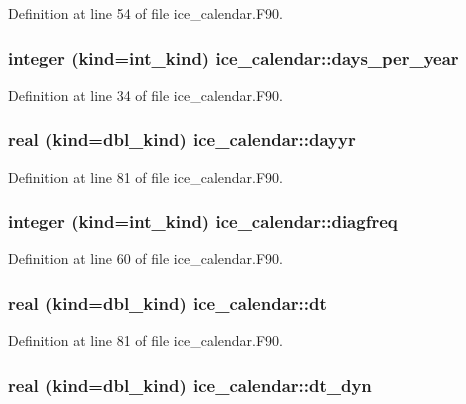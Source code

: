 Definition at line 54 of file ice\_\-calendar.F90.\hypertarget{namespaceice__calendar_a1fa9382761e78de77e0109c55630554b}{
\subsubsection[{days\_\-per\_\-year}]{\setlength{\rightskip}{0pt plus 5cm}integer (kind=int\_\-kind) {\bf ice\_\-calendar::days\_\-per\_\-year}}}
\label{namespaceice__calendar_a1fa9382761e78de77e0109c55630554b}


Definition at line 34 of file ice\_\-calendar.F90.\hypertarget{namespaceice__calendar_a729d7e640fbfecac3733865efcfcb042}{
\subsubsection[{dayyr}]{\setlength{\rightskip}{0pt plus 5cm}real (kind=dbl\_\-kind) {\bf ice\_\-calendar::dayyr}}}
\label{namespaceice__calendar_a729d7e640fbfecac3733865efcfcb042}


Definition at line 81 of file ice\_\-calendar.F90.\hypertarget{namespaceice__calendar_aec83d850502df509fde73dbd084c2dc5}{
\subsubsection[{diagfreq}]{\setlength{\rightskip}{0pt plus 5cm}integer (kind=int\_\-kind) {\bf ice\_\-calendar::diagfreq}}}
\label{namespaceice__calendar_aec83d850502df509fde73dbd084c2dc5}


Definition at line 60 of file ice\_\-calendar.F90.\hypertarget{namespaceice__calendar_a8b89d489532c51cefe59876296c1f568}{
\subsubsection[{dt}]{\setlength{\rightskip}{0pt plus 5cm}real (kind=dbl\_\-kind) {\bf ice\_\-calendar::dt}}}
\label{namespaceice__calendar_a8b89d489532c51cefe59876296c1f568}


Definition at line 81 of file ice\_\-calendar.F90.\hypertarget{namespaceice__calendar_a3bb2bcfc8ce6074351961d80011c706a}{
\subsubsection[{dt\_\-dyn}]{\setlength{\rightskip}{0pt plus 5cm}real (kind=dbl\_\-kind) {\bf ice\_\-calendar::dt\_\-dyn}}}
\label{namespaceice__calendar_a3bb2bcfc8ce6074351961d80011c706a}



